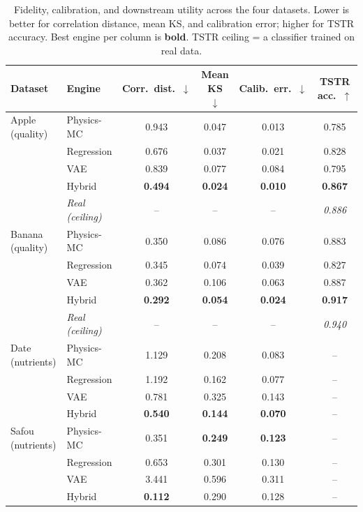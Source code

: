 \begin{table}[t]
\centering
\caption{Fidelity, calibration, and downstream utility across the four datasets. Lower is better for correlation distance, mean KS, and calibration error; higher for TSTR accuracy. Best engine per column is \textbf{bold}. TSTR ceiling = a classifier trained on real data.}
\label{tab:main}
\begin{tabular}{ll cccc}
\toprule
Dataset & Engine & Corr.\ dist.\ $\downarrow$ & Mean KS $\downarrow$ & Calib.\ err.\ $\downarrow$ & TSTR acc.\ $\uparrow$ \\
\midrule
Apple (quality) & Physics-MC & 0.943 & 0.047 & 0.013 & 0.785 \\
 & Regression & 0.676 & 0.037 & 0.021 & 0.828 \\
 & VAE & 0.839 & 0.077 & 0.084 & 0.795 \\
 & Hybrid & \textbf{0.494} & \textbf{0.024} & \textbf{0.010} & \textbf{0.867} \\
 & \textit{Real (ceiling)} & -- & -- & -- & \textit{0.886} \\
\midrule
Banana (quality) & Physics-MC & 0.350 & 0.086 & 0.076 & 0.883 \\
 & Regression & 0.345 & 0.074 & 0.039 & 0.827 \\
 & VAE & 0.362 & 0.106 & 0.063 & 0.887 \\
 & Hybrid & \textbf{0.292} & \textbf{0.054} & \textbf{0.024} & \textbf{0.917} \\
 & \textit{Real (ceiling)} & -- & -- & -- & \textit{0.940} \\
\midrule
Date (nutrients) & Physics-MC & 1.129 & 0.208 & 0.083 & -- \\
 & Regression & 1.192 & 0.162 & 0.077 & -- \\
 & VAE & 0.781 & 0.325 & 0.143 & -- \\
 & Hybrid & \textbf{0.540} & \textbf{0.144} & \textbf{0.070} & -- \\
\midrule
Safou (nutrients) & Physics-MC & 0.351 & \textbf{0.249} & \textbf{0.123} & -- \\
 & Regression & 0.653 & 0.301 & 0.130 & -- \\
 & VAE & 3.441 & 0.596 & 0.311 & -- \\
 & Hybrid & \textbf{0.112} & 0.290 & 0.128 & -- \\
\bottomrule
\end{tabular}
\end{table}
